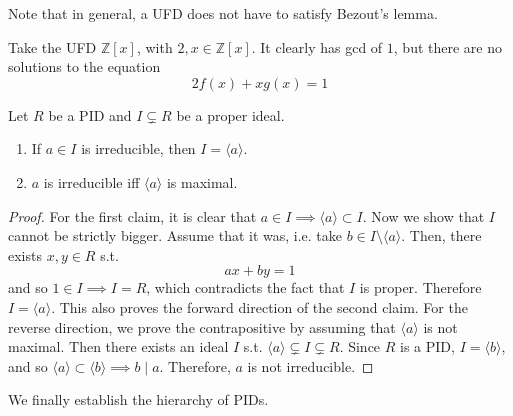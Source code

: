   Note that in general, a UFD does not have to satisfy Bezout's lemma. 

  \begin{example}
    Take the UFD $\mathbb{Z}[x]$, with $2, x \in \mathbb{Z}[x]$. It clearly has gcd of $1$, but there are no solutions to the equation 
    \begin{equation}
      2 f(x) + x g(x) = 1
    \end{equation}
  \end{example}

  \begin{corollary}
    \label{thm:irreducible-maximal}
    Let $R$ be a PID and $I \subsetneq R$ be a proper ideal. 
    \begin{enumerate}
      \item If $a \in I$ is irreducible, then $I = \langle a \rangle$.
      \item $a$ is irreducible iff $\langle a \rangle$ is maximal. 
    \end{enumerate}
  \end{corollary}
  \begin{proof}
    For the first claim, it is clear that $a \in I \implies \langle a \rangle \subset I$. Now we show that $I$ cannot be strictly bigger. Assume that it was, i.e. take $b \in I \setminus \langle a \rangle$. Then, there exists $x, y \in R$ s.t. 
      \begin{equation}
        ax + by = 1
      \end{equation}
    and so $1 \in I \implies I = R$, which contradicts the fact that $I$ is proper. Therefore $I = \langle a \rangle$. This also proves the forward direction of the second claim. For the reverse direction, we prove the contrapositive by assuming that $\langle a \rangle$ is not maximal. Then there exists an ideal $I$ s.t. $\langle a \rangle \subsetneq I \subsetneq R$. Since $R$ is a PID, $I = \langle b \rangle$, and so $\langle a \rangle \subset \langle b \rangle \implies b \mid a$. Therefore, $a$ is not irreducible. 
  \end{proof}

  We finally establish the hierarchy of PIDs. 

